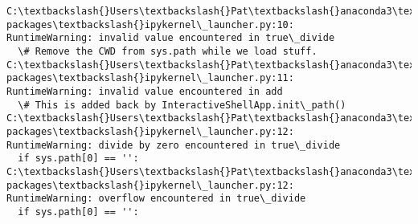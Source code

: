 \documentclass[11pt]{article}
\begin{document}
\begin{Verbatim}[commandchars=\\\{\}]
C:\textbackslash{}Users\textbackslash{}Pat\textbackslash{}anaconda3\textbackslash{}lib\textbackslash{}site-packages\textbackslash{}ipykernel\_launcher.py:10:
RuntimeWarning: invalid value encountered in true\_divide
  \# Remove the CWD from sys.path while we load stuff.
C:\textbackslash{}Users\textbackslash{}Pat\textbackslash{}anaconda3\textbackslash{}lib\textbackslash{}site-packages\textbackslash{}ipykernel\_launcher.py:11:
RuntimeWarning: invalid value encountered in add
  \# This is added back by InteractiveShellApp.init\_path()
C:\textbackslash{}Users\textbackslash{}Pat\textbackslash{}anaconda3\textbackslash{}lib\textbackslash{}site-packages\textbackslash{}ipykernel\_launcher.py:12:
RuntimeWarning: divide by zero encountered in true\_divide
  if sys.path[0] == '':
C:\textbackslash{}Users\textbackslash{}Pat\textbackslash{}anaconda3\textbackslash{}lib\textbackslash{}site-packages\textbackslash{}ipykernel\_launcher.py:12:
RuntimeWarning: overflow encountered in true\_divide
  if sys.path[0] == '':
    \end{Verbatim}

    \begin{center}
    \end{center}
    { \hspace*{\fill} \\}
    
    \begin{center}
    \end{center}
    { \hspace*{\fill} \\}
    
\end{document}
